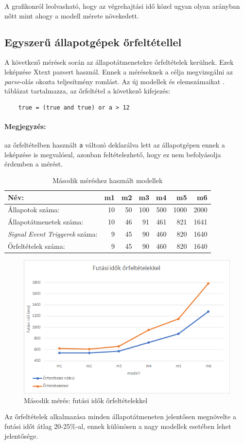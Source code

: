 A grafikonról leolvasható, hogy az végrehajtási idő közel ugyan olyan arányban nőtt mint ahogy a modell mérete növekedett.

\subsection{Egyszerű állapotgépek őrfeltétellel}

A következő mérések során az állapotátmenetekre őrfeltételek kerülnek. Ezek leképzése Xtext parsert használ. Ennek a méréseknek a célja megvizsgálni az \emph{parse}-olás okozta teljesítmény romlást. Az új modellek és elemszámaikat . táblázat tartalmazza, az őrfeltétel a következő kifejezés:
\begin{lstlisting}
	true = (true and true) or a > 12
\end{lstlisting}

\paragraph{Megjegyzés:} az őrfeltételben használt \verb+a+ változó deklarálva lett az állapotgépen ennek a leképzése is megvalósul, azonban feltételezhető, hogy ez nem befolyásolja érdemben a mérést.

\begin{table}[H]
	\footnotesize
	\centering
	\begin{tabular}{ l r r r r r r}
		Név: & m1 & m2 & m3 & m4 & m5 & m6 \\ \hline
		Állapotok száma:  & 10 & 50 & 100 & 500 & 1000 & 2000 \\
		Állapotátmenetek száma: & 10 & 46 & 91 & 461 & 821 & 1641 \\
		\emph{Signal Event Triggerek} száma: & 9 & 45 & 90 & 460 & 820 & 1640 \\
		Őrfeltételek száma: & 9 & 45 & 90 & 460 & 820 & 1640
	\end{tabular}
	\caption{Második méréshez használt modellek}
	\label{table:meres2}
\end{table}

\begin{figure}[H]
	\centering
	\includegraphics[keepaspectratio, width=140mm]{figures/meres2.png}
	\caption{Második mérés: futási idők őrfeltételekkel}
	\label{fig:meres2}
\end{figure}

Az őrfeltételek alkalmazása minden állapotátmeneten jelentősen megnövelte a futási időt átlag 20-25\%-al, ennek különösen a nagy modellek esetében lehet jelentősége.












